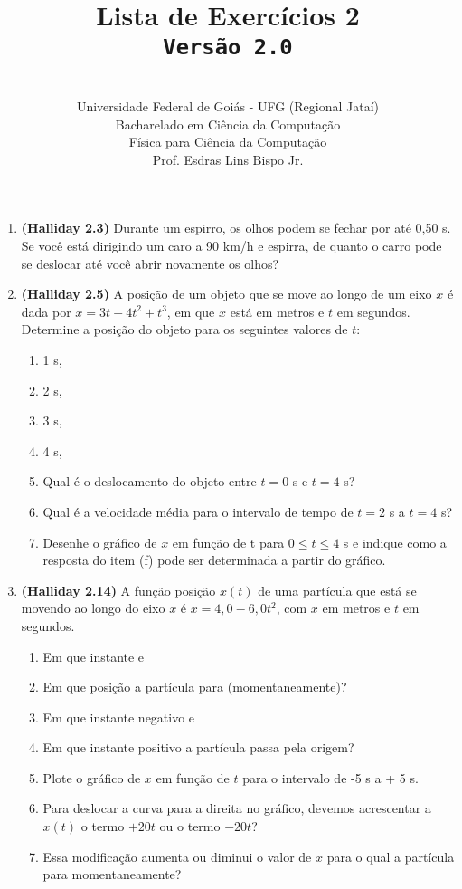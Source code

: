 \documentclass[12pt,a4paper,oneside]{article}
\author{\\Universidade Federal de Goiás - UFG (Regional Jataí) \\Bacharelado em Ciência da Computação \\Física para Ciência da Computação \\Prof. Esdras Lins Bispo Jr.}
\title{
	{\sc \huge Lista de Exercícios 2} 
	\\{\tt Versão 2.0}
}
\begin{document}
\maketitle

\begin{enumerate}

\section{Conceitos}
	
	\item {\bf (Halliday 2.3)} Durante um espirro, os olhos podem se fechar por até 0,50 s. Se você está dirigindo um caro a 90 km/h e espirra, de quanto o carro pode se deslocar até você abrir novamente os olhos?
	
	\item {\bf (Halliday 2.5)} A posição de um objeto que se move ao longo de um eixo $x$ é dada por $x = 3t - 4t^2 + t^3$, em que $x$ está em metros e $t$ em segundos. Determine a posição do objeto para os seguintes valores de $t$: 
		\begin{enumerate}
			\item 1 s,
			\item 2 s,
			\item 3 s,
			\item 4 s,
			\item Qual é o deslocamento do objeto entre $t = 0$ s e $t = 4$ s?
			\item Qual é a velocidade média para o intervalo de tempo de $t = 2$ s a $t = 4$ s?
			\item Desenhe o gráfico de $x$ em função de t para $0 \leq t \leq 4$ s e indique como a resposta do item (f) pode ser
			determinada a partir do gráfico.
		\end{enumerate}
	
	\item {\bf (Halliday 2.14)} A função posição $x(t)$ de uma partícula que está se movendo ao longo do eixo $x$ é $x = 4,0 - 6,0t^2$, com $x$ em metros e $t$ em segundos. \label{q:2-14}
	\begin{enumerate}
		\item Em que instante e
		\item Em que posição a partícula para (momentaneamente)?
		\item Em que instante negativo e
		\item Em que instante positivo a partícula passa pela origem?
		\item Plote o gráfico de $x$ em função de $t$ para o intervalo de -5 s a + 5 s.
		\item Para deslocar a curva para a direita no gráfico, devemos acrescentar a $x(t)$ o termo $+20t$ ou o termo $-20t$?
		\item Essa modificação aumenta ou diminui o valor de $x$ para o qual a partícula para momentaneamente?
	\end{enumerate}


\end{enumerate}
\end{document}
